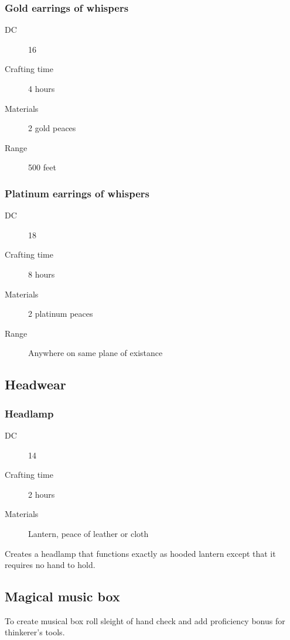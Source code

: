 \subsubsection{Gold earrings of whispers}

\begin{description}
\item [DC] 16
\item [Crafting time] 4 hours
\item [Materials] 2 gold peaces
\item [Range] 500 feet
\end{description}

\subsubsection{Platinum earrings of whispers}

\begin{description}
\item [DC] 18
\item [Crafting time] 8 hours
\item [Materials] 2 platinum peaces
\item [Range] Anywhere on same plane of existance
\end{description}

\subsection{Headwear}

\subsubsection{Headlamp}

\begin{description}
\item [DC] 14
\item [Crafting time] 2 hours
\item [Materials] Lantern, peace of leather or cloth
\end{description}

Creates a headlamp that functions exactly as hooded lantern except that it requires no hand to hold.

\subsection{Magical music box}

To create musical box roll sleight of hand check and add proficiency bonus for thinkerer's tools.

